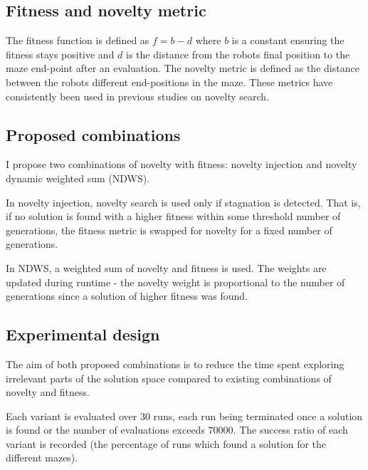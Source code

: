 \subsection{Fitness and novelty metric}
The fitness function is defined as $f = b - d$ where $b$ is a constant ensuring the fitness stays positive
and $d$ is the distance from the robots final position to the maze end-point after an evaluation.
The novelty metric is defined as the distance between the robots different end-positions in the maze.
These metrics have consistently been used in previous studies on novelty search.

\subsection{Proposed combinations}
I propose two combinations of novelty with fitness: novelty injection and novelty dynamic weighted sum (NDWS).

In novelty injection, novelty search is used only if stagnation is detected. That is, if no solution is found with a
higher fitness within some threshold number of generations, the fitness metric is swapped for novelty for a fixed
number of generations.

In NDWS, a weighted sum of novelty and fitness is used. The weights are updated during runtime - the novelty
weight is proportional to the number of generations since a solution of higher fitness was found.

\subsection{Experimental design}
The aim of both proposed combinations is to reduce the time spent exploring irrelevant parts of the solution space
compared to existing combinations of novelty and fitness.

Each variant is evaluated over $30$ runs, each run being terminated once a solution is found
or the number of evaluations exceeds $70 000$. The success ratio of each variant is recorded
(the percentage of runs which found a solution for the different mazes).